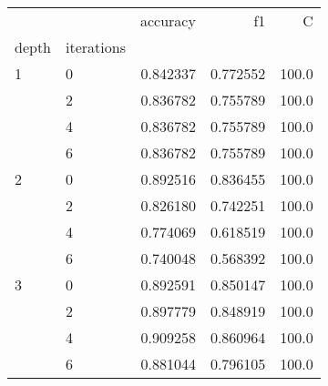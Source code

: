 \begin{tabular}{llrrr}
\toprule
  &   &  accuracy &        f1 &      C \\
depth & iterations &           &           &        \\
\midrule
1 & 0 &  0.842337 &  0.772552 &  100.0 \\
  & 2 &  0.836782 &  0.755789 &  100.0 \\
  & 4 &  0.836782 &  0.755789 &  100.0 \\
  & 6 &  0.836782 &  0.755789 &  100.0 \\
2 & 0 &  0.892516 &  0.836455 &  100.0 \\
  & 2 &  0.826180 &  0.742251 &  100.0 \\
  & 4 &  0.774069 &  0.618519 &  100.0 \\
  & 6 &  0.740048 &  0.568392 &  100.0 \\
3 & 0 &  0.892591 &  0.850147 &  100.0 \\
  & 2 &  0.897779 &  0.848919 &  100.0 \\
  & 4 &  0.909258 &  0.860964 &  100.0 \\
  & 6 &  0.881044 &  0.796105 &  100.0 \\
\bottomrule
\end{tabular}
